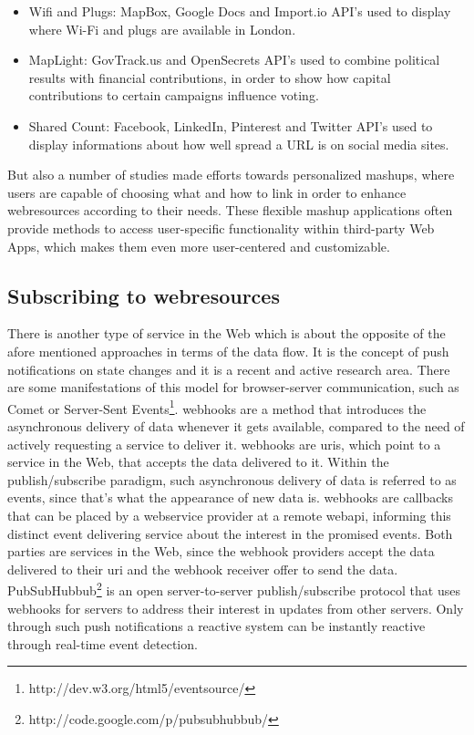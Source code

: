 \begin{itemize}
  \item \textrm{Wifi and Plugs}: MapBox, Google Docs and Import.io API's used to display where Wi-Fi and plugs are available in London.
  \item \textrm{MapLight}: GovTrack.us and OpenSecrets API's used to combine political results with financial contributions, in order to show how capital contributions to certain campaigns influence voting.
  \item \textrm{Shared Count}: Facebook, LinkedIn, Pinterest and Twitter API's used to display informations about how well spread a URL is on social media sites.
\end{itemize}

But also a number of studies\cite{10.1007/978-3-642-22233-7_11}\cite{4278815}\cite{Rizzotti:2010:UST:1772690.1772861}\cite{Stolee20131289} made efforts towards personalized \textrm{\glspl{mashup}}, where users are capable of choosing what and how to link in order to enhance \textrm{\glspl{webresource}} according to their needs.
These flexible \textrm{\gls{mashup}} applications often provide methods to access user-specific functionality within third-party \textrm{Web Apps}, which makes them even more user-centered and customizable.


\subsection{Subscribing to \glspl{webresource}}
There is another type of service in the Web which is about the opposite of the afore mentioned approaches in terms of the data flow.
It is the concept of push notifications on state changes and it is a recent and active research area.
There are some manifestations of this model for browser-server communication, such as \textrm{Comet}\cite{5631249} or \textrm{Server-Sent Events}\footnote{http://dev.w3.org/html5/eventsource/}.
\textrm{\glspl{webhook}} are a method that introduces the asynchronous delivery of data whenever it gets available, compared to the need of actively requesting a service to deliver it.
\textrm{\glspl{webhook}} are \textrm{\acrshort{uri}s}, which point to a service in the Web, that accepts the data delivered to it.
Within the publish/subscribe paradigm\cite{Eugster:2003:MFP:857076.857078}, such asynchronous delivery of data is referred to as events, since that's what the appearance of new data is.
\textrm{\glspl{webhook}} are callbacks that can be placed by a \textrm{\gls{webservice}} provider at a remote \textrm{\gls{webapi}}, informing this distinct event delivering service about the interest in the promised events.
Both parties are services in the Web, since the \textrm{\gls{webhook}} providers accept the data delivered to their \textrm{\acrshort{uri}} and the \textrm{\gls{webhook}} receiver offer to send the data.
\textrm{PubSubHubbub}\footnote{http://code.google.com/p/pubsubhubbub/} is an open server-to-server publish/subscribe protocol that uses \textrm{\glspl{webhook}} for servers to address their interest in updates from other servers.
Only through such push notifications a reactive system can be instantly reactive through real-time event detection.


